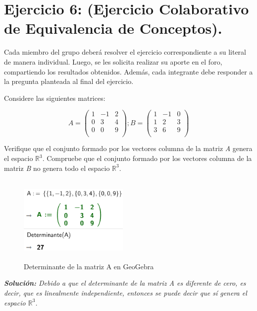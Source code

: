 \section{\large Ejercicio 6: (Ejercicio Colaborativo de Equivalencia de Conceptos).}

Cada miembro del grupo deberá resolver el ejercicio correspondiente a su literal de manera individual. Luego, se les solicita realizar su aporte en el foro, compartiendo los resultados obtenidos. Además, cada integrante debe responder a la pregunta planteada al final del ejercicio.

Considere las siguientes matrices:

\[
    A=\begin{pmatrix}
        1 & -1 & 2 \\
        0 & 3 & 4 \\
        0 & 0 & 9 \\
    \end{pmatrix};
    B=\begin{pmatrix}
        1 & -1 & 0 \\
        1 & 2 & 3 \\
        3 & 6 & 9 \\
    \end{pmatrix}
\]

Verifique que el conjunto formado por los vectores columna de la matriz \textit{A} genera el espacio $\mathbb{R}^3$. Compruebe que el conjunto formado por los vectores columna de la matriz \textit{B} no genera todo el espacio $\mathbb{R}^3$.

\begin{figure}[ht!]
    \centering
    \includegraphics[width=150pt,height=120pt]{img/imagen16.png}
    \caption{Determinante de la matriz A en GeoGebra}
\end{figure}

\begin{center}
    \textit{\textbf{Solución: }Debido a que el determinante de la matriz A es diferente de cero, es decir, que es linealmente independiente, entonces se puede decir que sí genera el espacio $\mathbb{R}^3$.}
\end{center}

